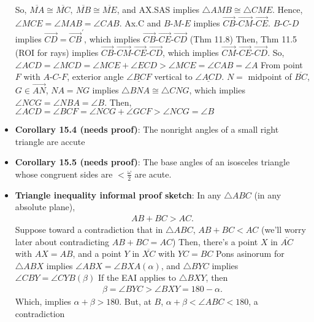 \documentclass{report}
\begin{document}
\begin{itemize}
            \bigbreak \noindent 
            So, $\overline{MA} \cong \overline{MC}, \ \overline{MB} \cong \overline{ME}$, and AX.SAS implies $ \triangle AMB  \cong \triangle CME$.
            \bigbreak \noindent 
            Hence, $\angle MCE  = \angle MAB = \angle CAB$. Ax.C and $ B\text{-}M\text{-}E$ implies $ \overrightarrow{CB}\text{-}\overrightarrow{CM}\text{-}\overrightarrow{CE} $. $ B\text{-}C\text{-}D $ implies $ \overrightarrow{CD} = \overrightarrow{CB}^{\prime} $, which implies $ \overrightarrow{CB}\text{-}\overrightarrow{CE}\text{-}\overrightarrow{CD} $ (Thm 11.8)
            \bigbreak \noindent 
            Then, Thm 11.5 (ROI for rays) implies $ \overrightarrow{CB}\text{-}\overrightarrow{CM}\text{-}\overrightarrow{CE}\text{-}\overrightarrow{CD}$, which implies $ \overrightarrow{CM}\text{-}\overrightarrow{CE}\text{-} \overrightarrow{CD}$. So, $ \angle ACD = \angle MCD = \angle MCE + \angle ECD > \angle MCE = \angle CAB = \angle A$
            \bigbreak \noindent 
            From point $F$ with $ A\text{-}C\text{-}F$, exterior angle $ \underline{\angle BCF}$ vertical to $ \underline{\angle ACD} $. $N = $ midpoint of $\overline{BC}$, $G \in \overrightarrow{AN}$, $NA = NG $ implies $ \triangle BNA \cong\triangle CNG$, which implies $\angle NCG = \angle NBA = \angle B$. Then, $\angle ACD = \angle BCF = \angle NCG + \angle GCF > \angle NCG = \angle B $
            \bigbreak \noindent 
        \item \textbf{Corollary 15.4 (needs proof)}: The nonright angles of a small right triangle are accute
        \item \textbf{Corollary 15.5 (needs proof)}: The base angles of an isosceles triangle whose congruent sides are $< \frac{\omega}{2}$ are acute.
        \item \textbf{Triangle inequality informal proof sketch}: In any $ \triangle ABC$ (in any absolute plane),
            \begin{align*}
                AB + BC > AC
            .\end{align*}
            Suppose toward a contradiction that in $ \triangle ABC $, $ AB + BC < AC$ (we'll worry later about contradicting $ AB + BC = AC $)
            \bigbreak \noindent 
            Then, there's a point $X$ in $ \overline{AC}$ with $AX = AB$, and a point $ Y$ in $ \overline{XC}$ with $YC = BC$
            \bigbreak \noindent 
            \bigbreak \noindent 
            Pons asinorum for $ \triangle ABX$ implies $ \angle ABX = \angle BXA (\alpha)$, and $ \triangle BYC$ implies $ \angle CBY = \angle CYB (\beta) $
            \bigbreak \noindent 
            \bigbreak \noindent 
            If the EAI applies to $ \triangle BXY$, then 
            \begin{align*}
                \beta = \angle BYC > \angle BXY = 180 - \alpha
            .\end{align*}
            Which, implies $ \alpha + \beta > 180$. But, at $B$, $ \alpha + \beta < \angle ABC < 180$, a contradiction


    \end{itemize}
\end{document}
